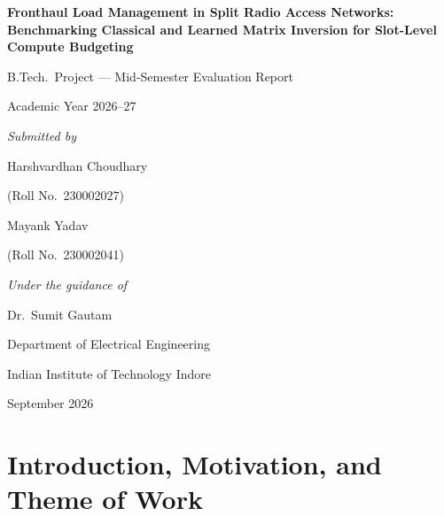 \documentclass[11pt,a4paper]{article}
\begin{document}
\begin{titlepage}
\centering
\vspace*{1.2cm}
{\LARGE\bfseries Fronthaul Load Management in Split Radio Access Networks: Benchmarking Classical and Learned Matrix Inversion for Slot-Level Compute Budgeting\par}
\vspace{1.6cm}
{\large B.Tech.\ Project --- Mid-Semester Evaluation Report\par}
\vspace{0.4cm}
{\large Academic Year 2026--27\par}
\vspace{2.0cm}
{\large\itshape Submitted by\par}
\vspace{0.5cm}
{\Large Harshvardhan Choudhary\par}
{\large (Roll No.\ 230002027)\par}
\vspace{0.5cm}
{\Large Mayank Yadav\par}
{\large (Roll No.\ 230002041)\par}
\vspace{2.0cm}
{\large\itshape Under the guidance of\par}
\vspace{0.4cm}
{\Large Dr.\ Sumit Gautam\par}
\vfill
{\large Department of Electrical Engineering\par}
\vspace{0.25cm}
{\large Indian Institute of Technology Indore\par}
\vspace{0.6cm}
{\large September 2026\par}
\end{titlepage}

\setcounter{page}{1}

\section{Introduction, Motivation, and Theme of Work}
\end{document}
